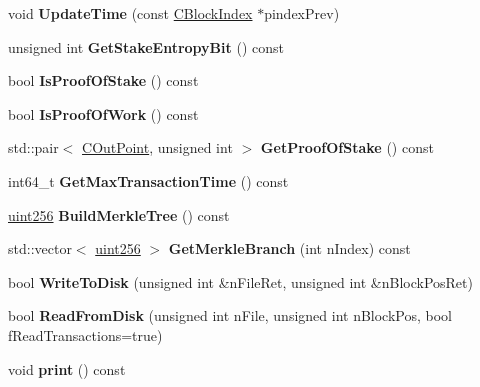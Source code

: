 \begin{DoxyCompactItemize}
void {\bfseries Update\+Time} (const \mbox{\hyperlink{class_c_block_index}{C\+Block\+Index}} $\ast$pindex\+Prev)
\item 
\mbox{\label{class_c_block_a7a7d6c0d7acfee68e90bb536d2772e34}} 
unsigned int {\bfseries Get\+Stake\+Entropy\+Bit} () const
\item 
\mbox{\label{class_c_block_ab70bdac61ff8eca54fd29c835cb4f025}} 
bool {\bfseries Is\+Proof\+Of\+Stake} () const
\item 
\mbox{\label{class_c_block_ad3936367b1b6d5289bb60b42967156ea}} 
bool {\bfseries Is\+Proof\+Of\+Work} () const
\item 
\mbox{\label{class_c_block_ab3e641daba5dd1a50fafc450ea8b2230}} 
std\+::pair$<$ \mbox{\hyperlink{class_c_out_point}{C\+Out\+Point}}, unsigned int $>$ {\bfseries Get\+Proof\+Of\+Stake} () const
\item 
\mbox{\label{class_c_block_af31184f09c937d798f7ae9ce4a468067}} 
int64\+\_\+t {\bfseries Get\+Max\+Transaction\+Time} () const
\item 
\mbox{\label{class_c_block_ad943ecec57cdf564937eee7becaecb88}} 
\mbox{\hyperlink{classuint256}{uint256}} {\bfseries Build\+Merkle\+Tree} () const
\item 
\mbox{\label{class_c_block_a7a3b82a1d7c641b20f4546f90533bca8}} 
std\+::vector$<$ \mbox{\hyperlink{classuint256}{uint256}} $>$ {\bfseries Get\+Merkle\+Branch} (int n\+Index) const
\item 
\mbox{\label{class_c_block_a606df2cab7dc67e5dd11b157d288cf2b}} 
bool {\bfseries Write\+To\+Disk} (unsigned int \&n\+File\+Ret, unsigned int \&n\+Block\+Pos\+Ret)
\item 
\mbox{\label{class_c_block_a77a1b1e9902e1e557d762f5a5f325cd8}} 
bool {\bfseries Read\+From\+Disk} (unsigned int n\+File, unsigned int n\+Block\+Pos, bool f\+Read\+Transactions=true)
\item 
\mbox{\label{class_c_block_a0507a658d82d5e4ec55d550460e06ff9}} 
void {\bfseries print} () const

\end{DoxyCompactItemize}
